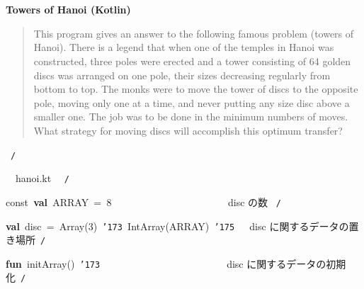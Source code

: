 \documentclass[a4paper,10pt]{article}
\def\mc{\relax}
\begin{document}
\tt\mc 

\noindent
\mbox{}\rm\mc {\tt /}{\tt *}\  \hrulefill *
\tt\mc 

\noindent
\mbox{}\hfill

\noindent
\mbox{}\rm\mc \ %

\centerline{\bf Towers of Hanoi (Kotlin)}

\begin{quote}

This program gives an answer to the following famous problem (towers of
Hanoi).
There is a legend that when one of the temples in Hanoi was constructed,
three poles were erected and a tower consisting of 64 golden discs was
arranged on one pole, their sizes decreasing regularly from bottom to top.
The monks were to move the tower of discs to the opposite pole, moving
only one at a time, and never putting any size disc above a smaller one.
The job was to be done in the minimum numbers of moves. What strategy for
moving discs will accomplish this optimum transfer?
\end{quote}

\tt\mc 

\noindent
\mbox{}\hfill

\noindent
\mbox{}\rm\mc {\tt *} \hrulefill \rm\mc \ {\tt *}{\tt /}
\tt\mc 

\noindent
\mbox{}\hfill

\noindent
\mbox{}\rm\mc {\tt /}{\tt *}\  \hrulefill\ hanoi.kt \ \hrulefill \rm\mc \ {\tt *}{\tt /}
\tt\mc 

\noindent
\mbox{}\hfill

\noindent
\mbox{}const{\tt\mc \ }\textbf{val}{\tt\mc \ }ARRAY{\tt\mc \ }={\tt\mc \ }8{\tt\mc \ }{\tt\mc \ }{\tt\mc \ }{\tt\mc \ }{\tt\mc \ }{\tt\mc \ }{\tt\mc \ }{\tt\mc \ }{\tt\mc \ }{\tt\mc \ }{\tt\mc \ }{\tt\mc \ }{\tt\mc \ }{\tt\mc \ }{\tt\mc \ }{\tt\mc \ }{\tt\mc \ }{\tt\mc \ }{\tt\mc \ }{\tt\mc \ }{\tt\mc \ }\rm\mc {\tt /}{\tt *}\  \ disc の数 \hfill \rm\mc \ {\tt *}{\tt /}
\tt\mc 

\noindent
\mbox{}\hfill

\noindent
\mbox{}\textbf{val}{\tt\mc \ }disc{\tt\mc \ }={\tt\mc \ }Array(3){\tt\mc \ }{\tt\char'173}{\tt\mc \ }IntArray(ARRAY){\tt\mc \ }{\tt\char'175}{\tt\mc \ }\rm\mc {\tt /}{\tt *}\  \ disc に関するデータの置き場所\hfill \rm\mc \ {\tt *}{\tt /}
\tt\mc 

\noindent
\mbox{}\hfill

\noindent
\mbox{}\textbf{fun}{\tt\mc \ }initArray(){\tt\mc \ }{\tt\char'173}{\tt\mc \ }{\tt\mc \ }{\tt\mc \ }{\tt\mc \ }{\tt\mc \ }{\tt\mc \ }{\tt\mc \ }{\tt\mc \ }{\tt\mc \ }{\tt\mc \ }{\tt\mc \ }{\tt\mc \ }{\tt\mc \ }{\tt\mc \ }{\tt\mc \ }{\tt\mc \ }{\tt\mc \ }{\tt\mc \ }{\tt\mc \ }{\tt\mc \ }{\tt\mc \ }{\tt\mc \ }{\tt\mc \ }\rm\mc {\tt /}{\tt *}\  \ disc に関するデータの初期化\hfill \rm\mc \ {\tt *}{\tt /}
\tt\mc 
\end{document}
